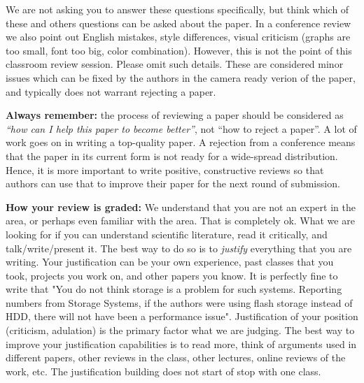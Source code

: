 \documentclass[sigconf,10pt, screen]{acmart}
\begin{document}
We are not asking you to answer these questions specifically, but think which of these and others questions can be asked about the paper. In a conference review we also point out English mistakes, style differences, visual criticism (graphs are too small, font too big, color combination). However, this is not the point of this classroom review session. Please omit such details. These are considered minor issues which can be fixed by the authors in the camera ready verion of the paper, and typically does not warrant rejecting a paper.  

\textbf{Always remember:} the process of reviewing a paper should be considered as \textit{“how can I help this paper to become better”}, not “how to reject a paper”. A lot of work goes on in writing a top-quality paper. A rejection from a conference means that the paper in its current form is not ready for a wide-spread distribution. Hence, it is more important to write positive, constructive reviews so that authors can use that to improve their paper for the next round of submission. 

\textbf{How your review is graded:} We understand that you are not an expert in the area, or perhaps even familiar with the area. That is completely ok. What we are looking for if you can understand scientific literature, read it critically, and talk/write/present it. The best way to do so is to \textit{justify} everything that you are writing. Your justification can be your own experience, past classes that you took, projects you work on, and other papers you know. It is perfectly fine to write that "You do not think storage is a problem for such systems. Reporting numbers from Storage Systems, if the authors were using flash storage instead of HDD, there will not have been a performance issue". Justification of your position (criticism, adulation) is the primary factor what we are judging. The best way to improve your justification capabilities is to read more, think of arguments used in different papers, other reviews in the class, other lectures, online reviews of the work, etc. The justification building does not start of stop with one class. 
\end{document}
